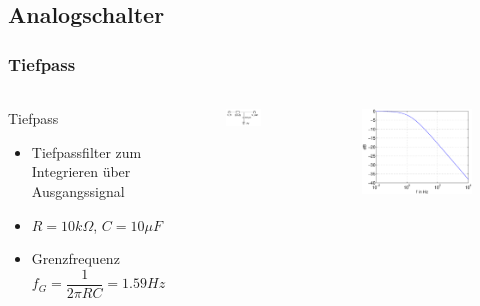 \subsection{Analogschalter} %
\label{sub:Analogschalter}
\begin{frame}
\frametitle{Tiefpass}
\framesubtitle{}
    \begin{columns}[c]
             \begin{block}{Tiefpass}
                 \begin{itemize}
                     \item Tiefpassfilter zum Integrieren über Ausgangssignal
                     \item $R=10k\Omega$, $C = 10\mu F$
                     \item Grenzfrequenz 
                     \begin{equation*}
                         f_G = \frac{1}{2 \pi R C} = 1.59Hz
                     \end{equation*}
                 \end{itemize}
             \end{block}
        \begin{figure}[H]
        \begin{center}
                \includegraphics[scale=0.4]{./img/schaltung/Tiefpass.png}
        \end{center}
        \end{figure}
        \begin{figure}[H]
        \begin{center}
                \includegraphics[scale=0.325]{./img/plots/theorie_tiefpass.eps}
        \end{center}
        \end{figure}
    \end{columns}
\end{frame}
